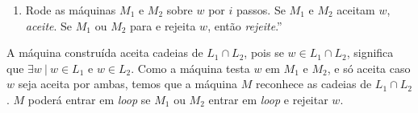 \begin{enumerate}[label={\textbf{\alph*.}}]
\begin{enumerate}[label={\textbf{\arabic*.}}, leftmargin=1in]
        \item Rode as máquinas $M_1$ e $M_2$ sobre $w$ por $i$ passos. Se $M_1$ e $M_2$ aceitam $w$, \textit{aceite}. Se $M_1$ ou $M_2$ para e rejeita $w$, então \textit{rejeite}.”
    \end{enumerate}
    
    A máquina construída aceita cadeias de $L_1 \cap L_2$, pois se $w \in L_1 \cap L_2$, significa que $\exists w \ |\ w \in L_1$ e $w \in L_2$. Como a máquina testa $w$ em $M_1$ e $M_2$, e só aceita caso $w$ seja aceita por ambas, temos que a máquina $M$ reconhece as cadeias de $L_1 \cap L_2$. $M$ poderá entrar em \textit{loop} se $M_1$ ou $M_2$ entrar em \textit{loop} e rejeitar $w$.
\end{enumerate}